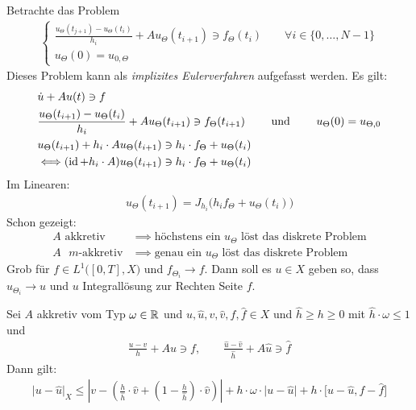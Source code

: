 Betrachte das Problem
\begin{align}\label{eqETheta}\tag{$E_\Theta$}
	\left\lbrace\begin{array}{l}
		\frac{u_\Theta(t_{j+1})-u_\Theta(t_i)}{h_i}+Au_\Theta(t_{i+1})\ni f_\Theta(t_i)\qquad\forall i\in\lbrace0,\ldots,N-1\rbrace\\
		u_\Theta(0)=u_{0,\Theta}
	\end{array}\right.
\end{align}
Dieses Problem kann als \textit{implizites Eulerverfahren} aufgefasst werden. 
Es gilt:
\begin{align*}
	&\dot{u}+Au(t)\ni f\\
	&\frac{u_\Theta(t_{i+1})-u_\Theta(t_i)}{h_i}+Au_\Theta(t_{i+1})\ni f_\Theta(t_{i+1})
	\qquad\text{ und }\qquad
	u_\Theta(0)=u_{\Theta,0}\\
	&u_\Theta(t_{i+1})+h_i\cdot A u_\Theta(t_{i+1})\ni h_i\cdot f_\Theta+u_\Theta(t_i)\\
	&\Longleftrightarrow (\operatorname{id}+h_i\cdot A)u_\Theta(t_{i+1})\ni h_i\cdot f_\Theta+u_\Theta(t_i)
\end{align*}
Im Linearen:
\begin{align*}
	u_\Theta(t_{i+1})=J_{h_i}\big(h_i f_\Theta+u_\Theta(t_i)\big)
\end{align*}
Schon gezeigt:
\begin{align*}
	A\text{ akkretiv}&\implies\text{höchstens ein $u_\Theta$ löst das diskrete Problem}\\
	A\text{ $m$-akkretiv}&\implies\text{genau ein $u_\Theta$ löst das diskrete Problem}
\end{align*}
Grob für $f\in L^1\big([0,T],X\big)$ und $f_{\Theta_i}\longrightarrow f$. Dann soll es $u\in X$ geben so, dass $u_{\Theta_i}\longrightarrow u$ und $u$ Integrallösung zur Rechten Seite $f$.

\begin{lemma}
	Sei $A$ akkretiv vom Typ $\omega\in\mathbb{R}$ und $u,\hat{u},v,\hat{v},f,\hat{f}\in X$ und $\hat{h}\geq h\geq 0$ mit $\hat{h}\cdot\omega\leq 1$ und 
	\begin{align*}
		\frac{u-v}{h}+Au\ni f,\qquad\frac{\hat{u}-\hat{v}}{\hat{h}}+A\hat{u}\ni\hat{f}
	\end{align*}
	Dann gilt:
	\begin{align*}
		\big|u-\hat{u}\big|_X\leq\left|v-\left(\frac{h}{\hat{h}}\cdot\hat{v}+\left(1-\frac{h}{\hat{h}}\right)\cdot\hat{v}\right)\right|+h\cdot\omega\cdot\big|u-\hat{u}\big|+h\cdot\big[ u-\hat{u},f-\hat{f}\big]
	\end{align*}
\end{lemma}

